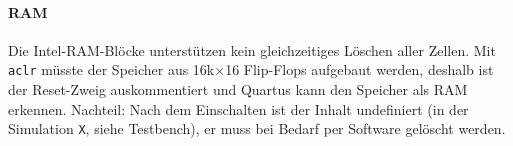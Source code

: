 \documentclass[11pt,a4paper]{article}
\begin{document}
\paragraph{RAM} Die Intel-RAM-Blöcke unterstützen kein gleichzeitiges Löschen aller Zellen.
Mit \texttt{aclr} müsste der Speicher aus 16k$\times$16 Flip-Flops aufgebaut werden, deshalb ist
der Reset-Zweig auskommentiert und Quartus kann den Speicher als RAM erkennen. Nachteil: Nach dem Einschalten ist der
Inhalt undefiniert (in der Simulation \texttt{X}, siehe Testbench), er muss bei Bedarf per
Software gelöscht werden.
\end{document}
